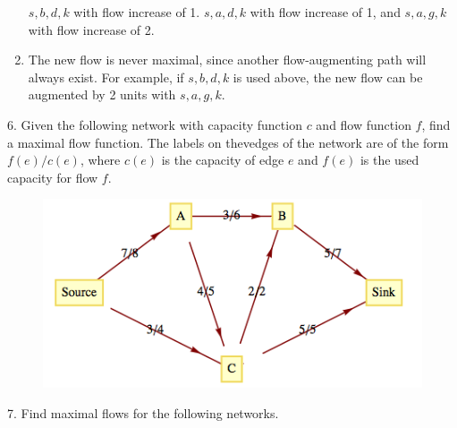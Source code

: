 \documentclass[10pt,]{book}
\theoremstyle{plain}
\theoremstyle{definition}
\theoremstyle{definition}
\theoremstyle{definition}
\theoremstyle{definition}
\theoremstyle{definition}
\numberwithin{equation}{section}
\newlength{\panelmax}
\begin{document}
\begin{exercisegroup}
\begin{enumerate}[label=\alph*]
\(s,b,d,k\) with flow increase of 1.
\(s,a,d,k\) with flow increase of 1, and
\(s,a,g,k\) with flow increase of 2.
%
\item\hypertarget{li-115}{}  The new flow is never maximal, since another flow-augmenting path will always exist. For example, if \(s,b,d,k\) is used above, the new flow
can be augmented by 2 units with \(s,a,g,k\).
%
\end{enumerate}
%
\item[6.]\hypertarget{exercise-36}{} Given the following network with capacity function \(c\) and flow function \(f\), find a maximal flow function. The labels on thevedges of the network are of the form \(f(e)/c(e)\), where \(c(e)\) is the capacity of edge \(e\) and \(f(e)\) is the used capacity for flow
\(f\).%
\leavevmode%
\begin{figure}
\centering
\includegraphics[width=1\linewidth]{images/fig-exercise-9-5-6.png}
\end{figure}
\par\smallskip
\item[7.]\hypertarget{exercise-37}{} Find maximal flows for the following networks.%
{%
\setlength{\panelmax}{0pt}
\newsavebox{\panelboxAIimage}
\newlength{\phAIimage}\setlength{\phAIimage}{\ht\panelboxAIimage+\dp\panelboxAIimage}
}
\end{exercisegroup}
\end{document}
